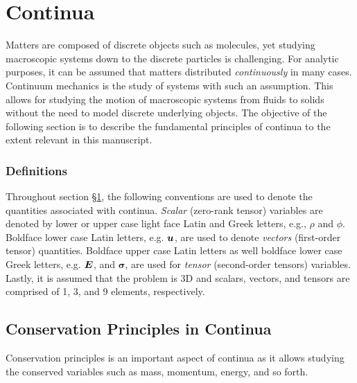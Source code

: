 \chapter{Continua}\label{chap:continua_Model}
Matters are composed of discrete objects such as molecules, yet studying macroscopic systems down to the discrete particles is challenging. For analytic purposes, it can be assumed that matters distributed \textit{continuously}  in many cases.  Continuum mechanics is the study of systems with such an assumption. This allows for studying the motion of macroscopic systems from fluids to solids without the need to model discrete underlying objects. The objective of the following section is to describe the fundamental principles of continua to the extent relevant in this manuscript.

\subsection*{Definitions}
Throughout section \S\ref{chap:continua_Model}, the following conventions are used to denote the quantities associated with continua. \textit{Scalar} (zero-rank tensor) variables are denoted by lower or upper case light face Latin and Greek letters, e.g., $\rho$ and $\phi$. Boldface lower case Latin letters, e.g. $\boldsymbol{u}$, are used to denote \textit{vectors} (first-order tensor) quantities. Boldface upper case Latin letters as well boldface lower case Greek letters, e.g. $\boldsymbol{E}$,  and $\bm \sigma$, are used for \textit{tensor} (second-order tensors) variables. Lastly, it is assumed that the problem is 3D and scalars, vectors, and tensors are comprised of 1, 3, and 9 elements, respectively. 

\section{Conservation Principles in Continua}
Conservation principles is an important aspect of continua as it allows studying the conserved variables such as mass, momentum, energy, and so forth.


